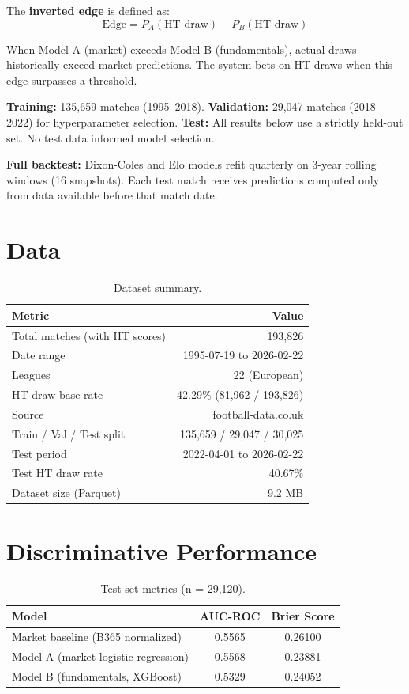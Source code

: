 \documentclass[11pt, letterpaper]{article}
\begin{document}
The \textbf{inverted edge} is defined as:
\[
\text{Edge} = P_A(\text{HT draw}) - P_B(\text{HT draw})
\]

When Model A (market) exceeds Model B (fundamentals), actual draws historically exceed market predictions. The system bets on HT draws when this edge surpasses a threshold.

\textbf{Training:} 135,659 matches (1995--2018). \textbf{Validation:} 29,047 matches (2018--2022) for hyperparameter selection. \textbf{Test:} All results below use a strictly held-out set. No test data informed model selection.

\textbf{Full backtest:} Dixon-Coles and Elo models refit quarterly on 3-year rolling windows (16 snapshots). Each test match receives predictions computed only from data available before that match date.

\section{Data}

\begin{table}[H]
\centering\small
\begin{tabular}{@{}lr@{}}
\toprule
\color{accent} Metric & \color{accent} Value \\
\midrule
Total matches (with HT scores) & 193,826 \\
Date range & 1995-07-19 to 2026-02-22 \\
Leagues & 22 (European) \\
HT draw base rate & 42.29\% (81,962 / 193,826) \\
Source & football-data.co.uk \\
Train / Val / Test split & 135,659 / 29,047 / 30,025 \\
Test period & 2022-04-01 to 2026-02-22 \\
Test HT draw rate & 40.67\% \\
Dataset size (Parquet) & 9.2 MB \\
\bottomrule
\end{tabular}
\caption{Dataset summary.}
\end{table}

\section{Discriminative Performance}

\begin{table}[H]
\centering\small
\begin{tabular}{@{}lcc@{}}
\toprule
\color{accent} Model & \color{accent} AUC-ROC & \color{accent} Brier Score \\
\midrule
Market baseline (B365 normalized) & 0.5565 & 0.26100 \\
Model A (market logistic regression) & 0.5568 & 0.23881 \\
Model B (fundamentals, XGBoost) & 0.5329 & 0.24052 \\
\bottomrule
\end{tabular}
\caption{Test set metrics (n = 29,120).}
\end{table}
\end{document}
